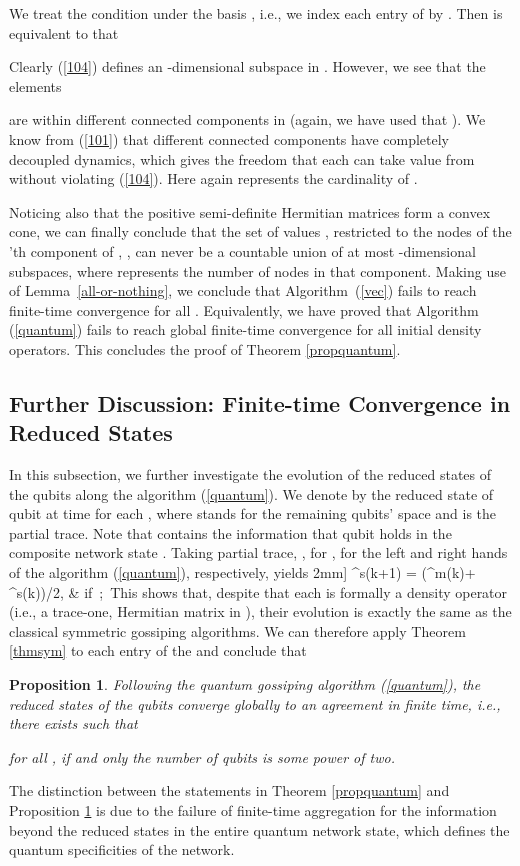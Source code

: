 \documentclass[a4paper, 11pt]{article}
\newtheorem{proposition}{Proposition}
\begin{document}
We treat the condition  under the basis  , i.e., we index each entry of  by . Then  is equivalent to that

Clearly (\ref{104}) defines an -dimensional subspace in . However, we see that the  elements

are within  different connected components in   (again, we have used that ). We know from (\ref{101}) that different connected components have completely decoupled dynamics, which gives the freedom that  each  can take value from  without violating (\ref{104}). Here again  represents the cardinality of .


Noticing also that the positive semi-definite Hermitian matrices form a convex cone, we can finally conclude that the set of values , restricted to the nodes of the 'th component of , , can never be a countable union of at most -dimensional subspaces, where  represents the number of nodes in that component. Making use of  Lemma~\ref{all-or-nothing}, we conclude that Algorithm~(\ref{vec}) fails to reach finite-time convergence for all . Equivalently, we have proved that  Algorithm (\ref{quantum}) fails to reach global finite-time convergence for all initial density operators. This concludes the proof of Theorem \ref{propquantum}.

{
\subsection{Further Discussion: Finite-time Convergence in Reduced States}
In this subsection, we further investigate the evolution of the reduced states of the qubits along the algorithm (\ref{quantum}). We denote by 
 the reduced state of qubit   at time  for each , where  stands for the remaining   qubits' space  and  is the partial trace. Note that  contains  the information that qubit  holds in the composite network state . Taking partial trace, , for , for the left and right hands of the algorithm (\ref{quantum}), respectively,  yields
2mm]
\rho^s(k+1) = \big(\rho^m(k)+ \rho^s(k)\big)/2,  & \mbox{if };\
This shows that, despite that  each  is formally a density operator (i.e., a trace-one,  Hermitian matrix in  ), their evolution is exactly the same as the  classical symmetric gossiping algorithms. We can therefore apply Theorem \ref{thmsym} to each entry of the 	 and conclude that

\medskip

\begin{proposition}\label{propreduced}
Following the quantum gossiping algorithm (\ref{quantum}), the reduced states of the qubits  converge globally to an agreement in finite time, i.e., there exists  such that
 
 for all , if and only the number of qubits  is some power of two.
\end{proposition}

\medskip


The distinction between  the statements in Theorem \ref{propquantum} and Proposition \ref{propreduced} is due to the failure of finite-time aggregation for the information beyond the reduced states in the entire quantum network state, which defines      the quantum specificities of the network.
}
\end{document}
